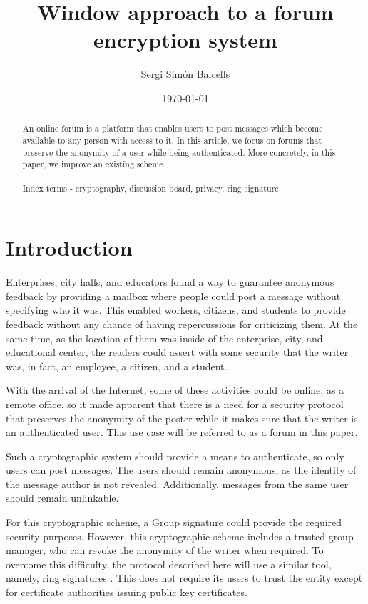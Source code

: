 \documentclass[11pt,congress]{ieeetran}
\author{Sergi Simón Balcells}
\date{\today}
\title{Window approach to a forum encryption system}
\begin{document}
\maketitle
\begin{abstract}
An online forum is a platform that enables users to post messages which become available to any
person with access to it. In this article, we focus on forums that preserve the anonymity of a
user while being authenticated. More concretely, in this paper, we improve an existing scheme.
\\\\
Index terms - cryptography, discussion board, privacy, ring signature
\end{abstract}

\section{Introduction}
\label{sec:orgba5403b}
Enterprises, city halls, and educators found a way to guarantee anonymous feedback by providing a mailbox
where people could post a message without specifying who it was. This enabled workers, citizens, and students
to provide feedback without any chance of having repercussions for criticizing them. At the same time, as the location of them was inside of the enterprise, city, and educational center, the readers could assert with some
security that the writer was, in fact, an employee, a citizen, and a student.

With the arrival of the Internet, some of these activities could be online, as a remote
office, so it made apparent that there is a need for a security protocol that preserves the
anonymity of the poster while it makes sure that the writer is an authenticated user. This use case
will be referred to as a forum in this paper.

Such a cryptographic system should provide a means to authenticate, so only users can post messages. The users
should remain anonymous, as the identity of the message author is not revealed. Additionally, messages from the same user should remain unlinkable.

For this cryptographic scheme, a Group signature \cite{group} could provide the required security purposes. However, this cryptographic scheme includes a trusted group manager, who can revoke the anonymity of the writer when required. To overcome this difficulty, the protocol described here will use a similar tool, namely, ring signatures \cite{ring}. This does not require its users to trust the entity except for
certificate authorities issuing public key certificates.
\end{document}
